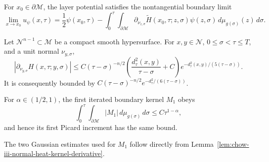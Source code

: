 \begin{lemma}
\label{lem:chow-iii-boundary-jump-relation}
For \(x_0\in\partial\mathcal M\), the layer potential satisfies the
nontangential boundary limit
\[
 \lim_{x\to x_0}u_\psi(x,\tau)
 =\frac12\psi(x_0,\tau)-\int_0^\tau\!\int_{\partial\mathcal M}
 \partial_{\nu_{z,\sigma}}\widetilde H(x_0,\tau;z,\sigma)
 \psi(z,\sigma)\,d\mu_{g(\sigma)}(z)\,d\sigma.
\]
\end{lemma}

\begin{lemma}
\label{lem:chow-iii-normal-heat-kernel-derivative}
Let \(\mathcal N^{n-1}\subset\mathcal M\) be a compact smooth hypersurface.
For \(x,y\in\mathcal N\), \(0\le\sigma<\tau\le T\), and a unit normal
\(\nu_{y,\sigma}\),
\[
 \left|\partial_{\nu_{y,\sigma}}H(x,\tau;y,\sigma)\right|
 \le C(\tau-\sigma)^{-n/2}
 \left(\frac{d_\tau^2(x,y)}{\tau-\sigma}+C\right)
 e^{-d_\tau^2(x,y)/(5(\tau-\sigma))}.
\]
It is consequently bounded by
\(C(\tau-\sigma)^{-n/2}e^{-d_\tau^2/(6(\tau-\sigma))}\).
\end{lemma}

\begin{remark}
\label{rem:chow-iii-first-boundary-kernel-integrable}
For \(\alpha\in(1/2,1)\), the first iterated boundary kernel \(M_1\) obeys
\[
 \int_0^\tau\!\int_{\partial\mathcal M}|M_1|
 \,d\mu_{g(\sigma)}\,d\sigma\le C\tau^{1-\alpha},
\]
and hence its first Picard increment has the same bound.
\end{remark}

\begin{remark}
\label{rem:chow-iii-normal-derivative-gaussian-bounds}
The two Gaussian estimates used for \(M_1\) follow directly from
Lemma~\ref{lem:chow-iii-normal-heat-kernel-derivative}.
\end{remark}

